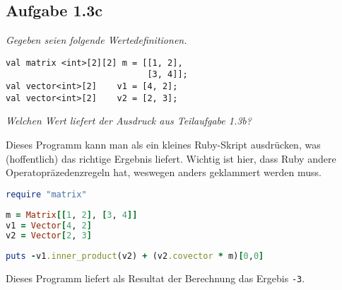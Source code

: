 \documentclass[
  ngerman,
  DIV=14
]{scrartcl}
\begin{document}
\subsection*{Aufgabe 1.3c}
\emph{Gegeben seien folgende Wertedefinitionen.}
\begin{lstlisting}
val matrix <int>[2][2] m = [[1, 2],
                            [3, 4]];
val vector<int>[2]    v1 = [4, 2];
val vector<int>[2]    v2 = [2, 3];
\end{lstlisting}
\emph{Welchen Wert liefert der Ausdruck aus Teilaufgabe 1.3b?}

\bigskip\noindent
Dieses Programm kann man als ein kleines Ruby-Skript ausdrücken, was (hoffentlich) das richtige Ergebnis liefert. Wichtig ist hier, dass Ruby andere Operatopräzedenzregeln hat, weswegen anders geklammert werden muss.
\begin{lstlisting}[language=ruby,morekeywords={require,puts}]
require "matrix"
\end{lstlisting}
\begin{lstlisting}[language=ruby,morekeywords={require,puts}]
m = Matrix[[1, 2], [3, 4]]
v1 = Vector[4, 2]
v2 = Vector[2, 3]
\end{lstlisting}
\begin{lstlisting}[language=ruby,morekeywords={require,puts}]
puts -v1.inner_product(v2) + (v2.covector * m)[0,0] 
\end{lstlisting}
Dieses Programm liefert als Resultat der Berechnung das Ergebis \texttt{-3}. 
\end{document}
